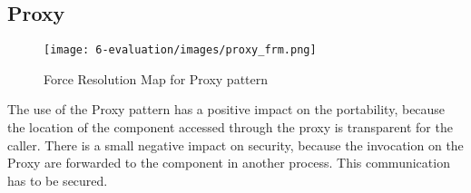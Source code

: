 \subsection{Proxy}
\begin{figure}[H]
\centering
\texttt{[image: 6-evaluation/images/proxy\_frm.png]}
\caption{Force Resolution Map for Proxy pattern}
\label{fig:proxy-frm}
\end{figure}
The use of the Proxy pattern has a positive impact on the portability, because the location of the component accessed through the proxy is transparent for the caller.
There is a small negative impact on security, because the invocation on the Proxy are forwarded to the component in another process. This communication has to be secured.


